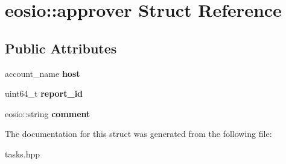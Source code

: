 \hypertarget{structeosio_1_1approver}{}\section{eosio\+:\+:approver Struct Reference}
\label{structeosio_1_1approver}
\subsection*{Public Attributes}
\begin{DoxyCompactItemize}
\item 
\mbox{\label{structeosio_1_1approver_a0fd071d070b256daaa175ea523c43386}} 
account\+\_\+name {\bfseries host}
\item 
\mbox{\label{structeosio_1_1approver_aea3e203759357b81546cae94f6c1047f}} 
uint64\+\_\+t {\bfseries report\+\_\+id}
\item 
\mbox{\label{structeosio_1_1approver_ab7abb3428b9df1385b0216b5f6fdc1ee}} 
eosio\+::string {\bfseries comment}
\end{DoxyCompactItemize}


The documentation for this struct was generated from the following file\+:\begin{DoxyCompactItemize}
\item 
tasks.\+hpp\end{DoxyCompactItemize}
